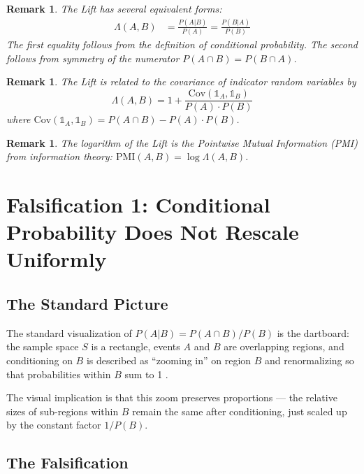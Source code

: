 \documentclass[12pt]{article}
\newtheorem{remark}[theorem]{Remark}
\begin{document}
\begin{remark}
The Lift has several equivalent forms:
\begin{align}
\Lambda(A,B) &= \frac{P(A|B)}{P(A)} = \frac{P(B|A)}{P(B)} \label{eq:lift_conditional}
\end{align}
The first equality follows from the definition of conditional probability. The second follows from symmetry of the numerator $P(A \cap B) = P(B \cap A)$.
\end{remark}

\begin{remark}
The Lift is related to the covariance of indicator random variables by
\begin{equation}
\Lambda(A,B) = 1 + \frac{\mathrm{Cov}(\mathbb{1}_A, \mathbb{1}_B)}{P(A) \cdot P(B)} \label{eq:lift_cov}
\end{equation}
where $\mathrm{Cov}(\mathbb{1}_A, \mathbb{1}_B) = P(A \cap B) - P(A) \cdot P(B)$.
\end{remark}

\begin{remark}
The logarithm of the Lift is the Pointwise Mutual Information (PMI) from information theory:
$\mathrm{PMI}(A,B) = \log \Lambda(A,B)$.
\end{remark}

\section{Falsification 1: Conditional Probability Does Not Rescale Uniformly}

\subsection{The Standard Picture}

The standard visualization of $P(A|B) = P(A \cap B) / P(B)$ is the dartboard: the sample space $S$ is a rectangle, events $A$ and $B$ are overlapping regions, and conditioning on $B$ is described as ``zooming in'' on region $B$ and renormalizing so that probabilities within $B$ sum to 1 \cite{moitra2024}.

The visual implication is that this zoom preserves proportions --- the relative sizes of sub-regions within $B$ remain the same after conditioning, just scaled up by the constant factor $1/P(B)$.

\subsection{The Falsification}
\end{document}
